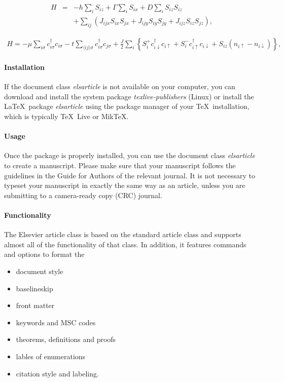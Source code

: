 \documentclass[review]{elsarticle}
\begin{document}
\begin{eqnarray}
H &=& -h \sum_{i} S_{i z} + \Gamma \sum_{i} S_{i x} + D \sum_{i} S_{i z} S_{i z}
\nonumber \\
&&+ \sum_{i j} \left( J_{i j x} S_{i x} S_{j x} + J_{i j y} S_{i y} S_{j y} + J_{i j z} S_{i z} S_{j z} 
\right),
\end{eqnarray}

\begin{eqnarray}
H = - \mu \sum_{i \sigma} c^\dagger_{i \sigma} c_{i \sigma} 
- t \sum_{\langle i j \rangle \sigma} c^\dagger_{i \sigma} c_{j \sigma} 
+ \frac{J}{2} \sum_{i} \left\{
S_{i}^{+} c_{i \downarrow}^\dagger c_{i \uparrow}
+ S_{i}^{-} c_{i \uparrow}^\dagger c_{i \downarrow}
+ S_{i z} (n_{i \uparrow} - n_{i \downarrow})
\right\},
\end{eqnarray}

\paragraph{Installation} If the document class \emph{elsarticle} is not available on your computer, you can download and install the system package \emph{texlive-publishers} (Linux) or install the \LaTeX\ package \emph{elsarticle} using the package manager of your \TeX\ installation, which is typically \TeX\ Live or Mik\TeX.

\paragraph{Usage} Once the package is properly installed, you can use the document class \emph{elsarticle} to create a manuscript. Please make sure that your manuscript follows the guidelines in the Guide for Authors of the relevant journal. It is not necessary to typeset your manuscript in exactly the same way as an article, unless you are submitting to a camera-ready copy (CRC) journal.

\paragraph{Functionality} The Elsevier article class is based on the standard article class and supports almost all of the functionality of that class. In addition, it features commands and options to format the
\begin{itemize}
\item document style
\item baselineskip
\item front matter
\item keywords and MSC codes
\item theorems, definitions and proofs
\item lables of enumerations
\item citation style and labeling.
\end{itemize}
\end{document}
